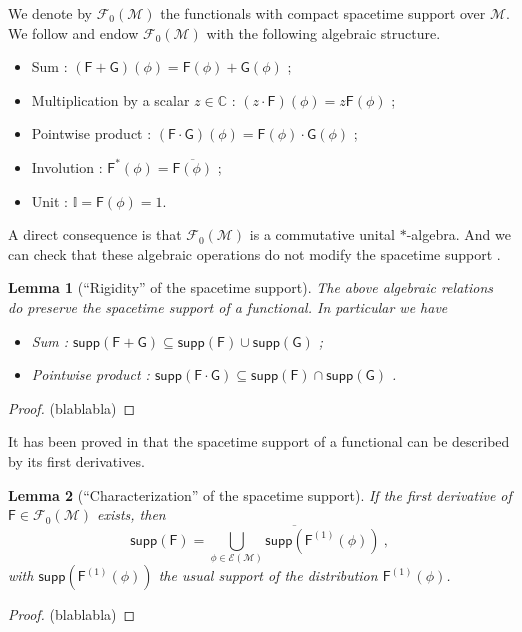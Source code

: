 \documentclass[10pt]{book}
\newcommand{\supp}{\mathsf{supp}}
\newcommand{\Ecal}{\mathcal{E}}
\newcommand{\Fcal}{\mathcal{F}}
\newcommand{\Mcal}{\mathcal{M}}
\newcommand{\Cbb}{\mathbb{C}}
\newcommand{\Ibb}{\mathbb{I}}
\newcommand{\Fsf}{\mathsf{F}}
\newcommand{\Gsf}{\mathsf{G}}
\theoremstyle{break}
\newtheorem{lemma}{Lemma}
\newtheorem{proof}{Proof}
\begin{document}
We denote by $\Fcal_0(\Mcal)$ the functionals with compact spacetime support over $\Mcal$. We follow
\cite{Brunetti:2012ar} and endow $\Fcal_0(\Mcal)$ with the following algebraic structure.
%
\begin{itemize}
\item Sum : $(\Fsf+\Gsf)(\phi) = \Fsf(\phi) + \Gsf(\phi)$ ;
\item Multiplication by a scalar $z\in\Cbb$ : $(z \cdot \Fsf)(\phi) = z \Fsf(\phi)$ ;
\item Pointwise product : $(\Fsf \cdot \Gsf)(\phi) = \Fsf(\phi) \cdot \Gsf(\phi)$ ;
\item Involution : $\Fsf^\ast(\phi) = \overline{\Fsf(\phi)}$ ;
\item Unit : $\Ibb = \Fsf(\phi) = 1$.
\end{itemize}
%
A direct consequence is that $\Fcal_0(\Mcal)$ is a commutative unital $\ast$-algebra. And we can check that these algebraic operations do not modify the spacetime support \cite[Lemma 2.3.3]{Brunetti:2012ar}.%
%
\begin{lemma}[``Rigidity'' of the spacetime support] \label{lem:spacetime}
The above algebraic relations do preserve the spacetime support of a functional. In particular we have
%
\begin{itemize}
\item Sum : $\supp(\Fsf + \Gsf) \subseteq \supp(\Fsf) \cup \supp(\Gsf)$ ;
\item Pointwise product :  $\supp(\Fsf \cdot \Gsf) \subseteq \supp(\Fsf) \cap \supp(\Gsf)$ .
\end{itemize}
%
\end{lemma}
%
%
\begin{proof}
(blablabla)
\end{proof}
%
It has been proved in \cite[Lemma 2.3.8]{Brunetti:2012ar} that the spacetime support of a functional can be described by its first derivatives.%
%
\begin{lemma}[``Characterization'' of the spacetime support]
If the first derivative of $\Fsf\in\Fcal_0(\Mcal)$ exists, then
%
\begin{equation*}
\supp\left(\Fsf\right) = \overline{\bigcup_{\phi\in\Ecal(\Mcal)} \supp\left(\Fsf^{(1)}(\phi)\right)} \ ,
\end{equation*}
%
with $\supp\left(\Fsf^{(1)}(\phi)\right)$ the usual support of the distribution $\Fsf^{(1)}(\phi)$.
\end{lemma}
%
\begin{proof}
(blablabla) 
\end{proof}
\end{document}
